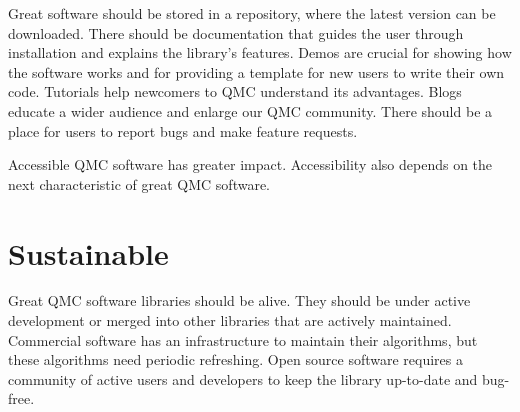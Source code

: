 \documentclass[graybox]{svmult}
\begin{document}
Great software should be stored in a repository, where the latest version can be downloaded.  There should be documentation that guides the user through installation and explains the library's features.  Demos are crucial for showing how the software works and for providing a template for new users to write their own code.  Tutorials help newcomers to QMC understand its advantages. Blogs educate a wider audience and enlarge our QMC community.  There should be a place for users to report bugs and make feature requests.

Accessible QMC software has greater impact.  Accessibility also depends on the next characteristic of great QMC software.


\section{Sustainable} \label{CDHJS_sec:sustainable}
Great QMC software libraries should be alive.  They should be under active development or merged into other libraries that are actively maintained.  Commercial software has an infrastructure to maintain their algorithms, but these algorithms need periodic refreshing. Open source software requires a community of active users and developers to keep the library up-to-date and bug-free.
\end{document}

